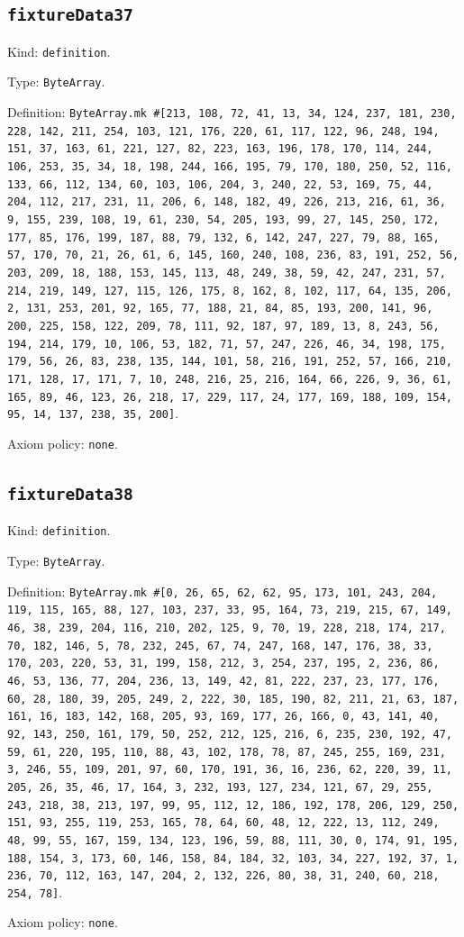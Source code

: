 \documentclass[11pt]{article}
\begin{document}
\subsection*{\texttt{fixtureData37}}
\noindent Kind: \texttt{definition}.\par
\noindent Type: \texttt{ByteArray}.\par
\noindent Definition: \texttt{ByteArray.mk \#[213, 108, 72, 41, 13, 34, 124, 237, 181, 230, 228, 142, 211, 254, 103, 121, 176, 220, 61, 117, 122, 96, 248, 194, 151, 37, 163, 61, 221, 127, 82, 223, 163, 196, 178, 170, 114, 244, 106, 253, 35, 34, 18, 198, 244, 166, 195, 79, 170, 180, 250, 52, 116, 133, 66, 112, 134, 60, 103, 106, 204, 3, 240, 22, 53, 169, 75, 44, 204, 112, 217, 231, 11, 206, 6, 148, 182, 49, 226, 213, 216, 61, 36, 9, 155, 239, 108, 19, 61, 230, 54, 205, 193, 99, 27, 145, 250, 172, 177, 85, 176, 199, 187, 88, 79, 132, 6, 142, 247, 227, 79, 88, 165, 57, 170, 70, 21, 26, 61, 6, 145, 160, 240, 108, 236, 83, 191, 252, 56, 203, 209, 18, 188, 153, 145, 113, 48, 249, 38, 59, 42, 247, 231, 57, 214, 219, 149, 127, 115, 126, 175, 8, 162, 8, 102, 117, 64, 135, 206, 2, 131, 253, 201, 92, 165, 77, 188, 21, 84, 85, 193, 200, 141, 96, 200, 225, 158, 122, 209, 78, 111, 92, 187, 97, 189, 13, 8, 243, 56, 194, 214, 179, 10, 106, 53, 182, 71, 57, 247, 226, 46, 34, 198, 175, 179, 56, 26, 83, 238, 135, 144, 101, 58, 216, 191, 252, 57, 166, 210, 171, 128, 17, 171, 7, 10, 248, 216, 25, 216, 164, 66, 226, 9, 36, 61, 165, 89, 46, 123, 26, 218, 17, 229, 117, 24, 177, 169, 188, 109, 154, 95, 14, 137, 238, 35, 200]}.\par
\noindent Axiom policy: \texttt{none}.\par
\subsection*{\texttt{fixtureData38}}
\noindent Kind: \texttt{definition}.\par
\noindent Type: \texttt{ByteArray}.\par
\noindent Definition: \texttt{ByteArray.mk \#[0, 26, 65, 62, 62, 95, 173, 101, 243, 204, 119, 115, 165, 88, 127, 103, 237, 33, 95, 164, 73, 219, 215, 67, 149, 46, 38, 239, 204, 116, 210, 202, 125, 9, 70, 19, 228, 218, 174, 217, 70, 182, 146, 5, 78, 232, 245, 67, 74, 247, 168, 147, 176, 38, 33, 170, 203, 220, 53, 31, 199, 158, 212, 3, 254, 237, 195, 2, 236, 86, 46, 53, 136, 77, 204, 236, 13, 149, 42, 81, 222, 237, 23, 177, 176, 60, 28, 180, 39, 205, 249, 2, 222, 30, 185, 190, 82, 211, 21, 63, 187, 161, 16, 183, 142, 168, 205, 93, 169, 177, 26, 166, 0, 43, 141, 40, 92, 143, 250, 161, 179, 50, 252, 212, 125, 216, 6, 235, 230, 192, 47, 59, 61, 220, 195, 110, 88, 43, 102, 178, 78, 87, 245, 255, 169, 231, 3, 246, 55, 109, 201, 97, 60, 170, 191, 36, 16, 236, 62, 220, 39, 11, 205, 26, 35, 46, 17, 164, 3, 232, 193, 127, 234, 121, 67, 29, 255, 243, 218, 38, 213, 197, 99, 95, 112, 12, 186, 192, 178, 206, 129, 250, 151, 93, 255, 119, 253, 165, 78, 64, 60, 48, 12, 222, 13, 112, 249, 48, 99, 55, 167, 159, 134, 123, 196, 59, 88, 111, 30, 0, 174, 91, 195, 188, 154, 3, 173, 60, 146, 158, 84, 184, 32, 103, 34, 227, 192, 37, 1, 236, 70, 112, 163, 147, 204, 2, 132, 226, 80, 38, 31, 240, 60, 218, 254, 78]}.\par
\noindent Axiom policy: \texttt{none}.\par
\end{document}
